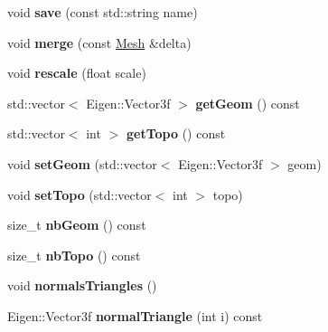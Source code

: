 \begin{DoxyCompactItemize}
\item 
\hypertarget{class_mesh_a6cdf793d9395cb3a0c339d72021d6aff}{}void {\bfseries save} (const std\+::string name)\label{class_mesh_a6cdf793d9395cb3a0c339d72021d6aff}

\item 
\hypertarget{class_mesh_a8ba5369aea36e244ec1e64421ea6c72e}{}void {\bfseries merge} (const \hyperlink{class_mesh}{Mesh} \&delta)\label{class_mesh_a8ba5369aea36e244ec1e64421ea6c72e}

\item 
\hypertarget{class_mesh_a02ddb78cd282aaa1aee3c5be3714110d}{}void {\bfseries rescale} (float scale)\label{class_mesh_a02ddb78cd282aaa1aee3c5be3714110d}

\item 
\hypertarget{class_mesh_aadb1a8eb73e41bc00ce79914073c83f5}{}std\+::vector$<$ Eigen\+::\+Vector3f $>$ {\bfseries get\+Geom} () const \label{class_mesh_aadb1a8eb73e41bc00ce79914073c83f5}

\item 
\hypertarget{class_mesh_a4bde57428f9650ced96c8d12e8125981}{}std\+::vector$<$ int $>$ {\bfseries get\+Topo} () const \label{class_mesh_a4bde57428f9650ced96c8d12e8125981}

\item 
\hypertarget{class_mesh_af6f08830a650970c6d824fe63856c599}{}void {\bfseries set\+Geom} (std\+::vector$<$ Eigen\+::\+Vector3f $>$ geom)\label{class_mesh_af6f08830a650970c6d824fe63856c599}

\item 
\hypertarget{class_mesh_afd7c08ccd98c9d0efd2b8a126fec89a1}{}void {\bfseries set\+Topo} (std\+::vector$<$ int $>$ topo)\label{class_mesh_afd7c08ccd98c9d0efd2b8a126fec89a1}

\item 
\hypertarget{class_mesh_ae55ff3af33692f3f186f64a57fb0ab63}{}size\+\_\+t {\bfseries nb\+Geom} () const \label{class_mesh_ae55ff3af33692f3f186f64a57fb0ab63}

\item 
\hypertarget{class_mesh_acacb677fdee9a8af20b9065b9a0e9499}{}size\+\_\+t {\bfseries nb\+Topo} () const \label{class_mesh_acacb677fdee9a8af20b9065b9a0e9499}

\item 
\hypertarget{class_mesh_acd306b83f9a484d90307d40f1f54659d}{}void {\bfseries normals\+Triangles} ()\label{class_mesh_acd306b83f9a484d90307d40f1f54659d}

\item 
\hypertarget{class_mesh_aa4b69ad68d61cb6acd383f6fc70220fa}{}Eigen\+::\+Vector3f {\bfseries normal\+Triangle} (int i) const \label{class_mesh_aa4b69ad68d61cb6acd383f6fc70220fa}


\end{DoxyCompactItemize}
